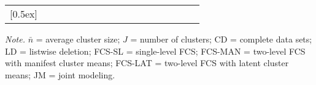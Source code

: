 \begin{sidewaystable}
\begin{threeparttable}
\begin{tabular}{llccccccccccccccc}
[0.5ex]\hline\\[-1.6ex] 
\end{tabular}
\begin{tablenotes}{\footnotesize \textit{Note.} $\bar{n}$ = average cluster size; $J$ = number of clusters; CD = complete data sets; LD = listwise deletion; FCS-SL = single-level FCS; FCS-MAN = two-level FCS with manifest cluster means; FCS-LAT = two-level FCS with latent cluster means; JM = joint modeling.}\end{tablenotes}
\end{threeparttable}
\end{sidewaystable}
